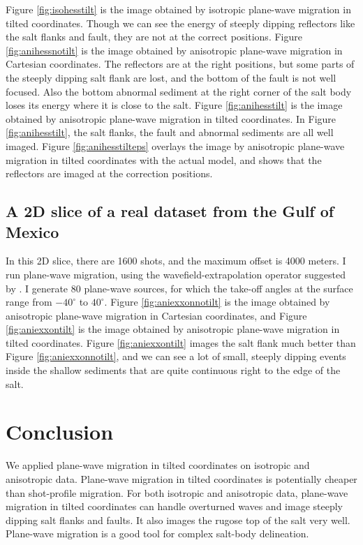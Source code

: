 \par
Figure \ref{fig:isohesstilt} is the image obtained by isotropic plane-wave migration in tilted coordinates. Though
we can see the energy of steeply dipping reflectors like the salt flanks and fault, they are not at the correct
positions. Figure \ref{fig:anihessnotilt} is the image obtained by anisotropic plane-wave migration in Cartesian 
coordinates. The reflectors are at the right positions, but some parts of the steeply dipping salt flank are lost,  and
the bottom of the fault is not well focused. Also the bottom abnormal sediment at the right corner of the salt body
loses its energy where it is close to the salt. Figure \ref{fig:anihesstilt} is the image obtained by anisotropic plane-wave
migration in tilted coordinates. In Figure \ref{fig:anihesstilt}, the salt flanks, the fault  and 
abnormal sediments are all well imaged. Figure \ref{fig:anihesstilteps} overlays the image by anisotropic plane-wave
migration in tilted coordinates with the actual model, and shows that the reflectors are imaged at 
the correction positions.


\subsection{A 2D slice of a real dataset from the Gulf of Mexico}
In this 2D slice, there are 1600 shots, and the maximum offset 
is 4000 meters. I run plane-wave migration, using the wavefield-extrapolation operator suggested by .
I generate 80 plane-wave sources, for which the take-off angles at the surface range from $-40^\circ$ to $40^\circ$.
 Figure \ref{fig:aniexxonnotilt} is the image obtained
by anisotropic plane-wave migration in Cartesian coordinates, and Figure \ref{fig:aniexxontilt} is the image
obtained by  anisotropic plane-wave migration in tilted coordinates. Figure \ref{fig:aniexxontilt} 
images the salt flank much better than Figure \ref{fig:aniexxonnotilt}, and we can see a lot of small, steeply dipping events 
inside the shallow sediments that are quite continuous right to the edge of the salt.


\section{Conclusion}
We applied plane-wave migration in tilted coordinates on isotropic and anisotropic data. 
Plane-wave migration in tilted coordinates is potentially cheaper than shot-profile migration. 
For both isotropic and anisotropic data, plane-wave migration in tilted coordinates can handle overturned waves and
 image steeply dipping salt flanks and faults. 
It also images the rugose top of the salt very well.  
Plane-wave migration is a good tool for complex salt-body delineation.

